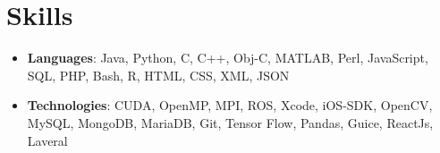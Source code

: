 \documentclass[a4paper,11pt]{article}
\newcommand{\skillItem}[2]{
	\item\small{
    \textbf{#1}{: #2 \vspace{-5pt}}
  }
}
\newcommand{\sectionStart}{\begin{itemize}[leftmargin=*]}
\newcommand{\sectionEnd}{\end{itemize}}
\begin{document}
\section{Skills}
	\sectionStart
		\skillItem{Languages}
		{Java, Python, C, C++, Obj-C, MATLAB, Perl, JavaScript, SQL, PHP, Bash, R, HTML, CSS, XML, JSON}
		\skillItem{Technologies}
		{CUDA, OpenMP, MPI, ROS, Xcode, iOS-SDK, OpenCV, MySQL, MongoDB, MariaDB, Git, Tensor Flow, Pandas, Guice, ReactJs, Laveral}
	\sectionEnd
\end{document}
